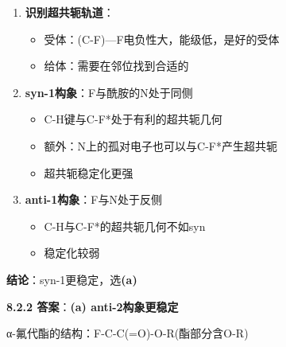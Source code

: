 \begin{enumerate}
\def\labelenumi{\arabic{enumi}.}
\tightlist
\item
  \textbf{识别超共轭轨道}：

  \begin{itemize}
  \tightlist
  \item
    受体：(C-F)---F电负性大，能级低，是好的受体
  \item
    给体：需要在邻位找到合适的
  \end{itemize}
\item
  \textbf{syn-1构象}：F与酰胺的N处于同侧

  \begin{itemize}
  \tightlist
  \item
    C-H键与C-F*处于有利的超共轭几何
  \item
    额外：N上的孤对电子也可以与C-F*产生超共轭
  \item
    超共轭稳定化更强
  \end{itemize}
\item
  \textbf{anti-1构象}：F与N处于反侧

  \begin{itemize}
  \tightlist
  \item
    C-H与C-F*的超共轭几何不如syn
  \item
    稳定化较弱
  \end{itemize}
\end{enumerate}

\textbf{结论}：syn-1更稳定，选\textbf{(a)}

\textbf{8.2.2 答案}：\textbf{(a) anti-2构象更稳定}

α-氟代酯的结构：F-C-C(=O)-O-R(酯部分含O-R)

